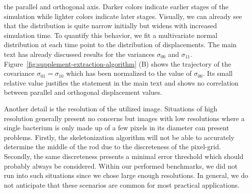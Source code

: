 \documentclass[10pt,letterpaper]{article}
\begin{document}
the parallel and orthogonal axis.
Darker colors indicate earlier stages of the simulation while lighter colors indicate later stages.
Visually, we can already see that the distribution is quite narrow initially but widens with
increased simulation time.
To quantify this behavior, we fit a multivariate normal distribution at each time point to the
distribution of displacements.
The main text has already discussed results for the variances $\sigma_{00}$ and $\sigma_{11}$.
Figure~\ref{fig:supplement-extraction-algorithm} (B) shows the trajectory of the covariance
$\sigma_{01}=\sigma_{10}$ which has been normalized to the value of $\sigma_{00}$.
Its small relative value justifies the statement in the main text and shows no correlation between
parallel and orthogonal displacement values.

Another detail is the resolution of the utilized image.
Situations of high resolution generally present no concerns but images with low resolutions where a
single bacterium is only made up of a few pixels in its diameter can present problems.
Firstly, the skeletonization algorithm will not be able to accurately determine the middle of the
rod due to the discreteness of the pixel-grid.
Secondly, the same discreteness presents a minimal error threshold which should probably always be
considered.
Within our performed benchmarks, we did not run into such situations since we chose large enough
resolutions.
In general, we do not anticipate that these scenarios are common for most practical applications.
\end{document}
